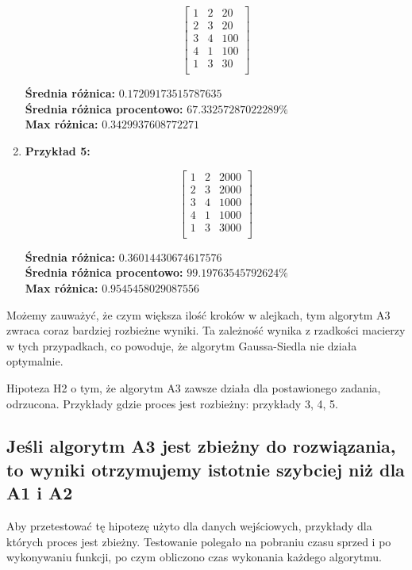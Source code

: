 \documentclass[12pt,a4paper]{article}
\begin{document}
\begin{enumerate}
\[
\begin{bmatrix}
1 & 2 & 20 \\
2 & 3 & 20 \\
3 & 4 & 100 \\
4 & 1 & 100 \\
1 & 3 & 30 \\
\end{bmatrix}
\]

\textbf{Średnia różnica:} $0.17209173515787635$ \\
\textbf{Średnia różnica procentowo:} $67.33257287022289 \%$ \\
\textbf{Max różnica:} $0.3429937608772271$

\item \textbf{Przykład 5:}

\[
\begin{bmatrix}
1 & 2 & 2000 \\
2 & 3 & 2000 \\
3 & 4 & 1000 \\
4 & 1 & 1000 \\
1 & 3 & 3000 \\
\end{bmatrix}
\]

\textbf{Średnia różnica:} $0.36014430674617576$ \\
\textbf{Średnia różnica procentowo:} $99.19763545792624 \%$ \\
\textbf{Max różnica:} $0.9545458029087556$
\end{enumerate}

Możemy zauważyć, że czym większa ilość kroków w alejkach, tym algorytm A3 zwraca coraz bardziej rozbieżne wyniki. Ta zależność wynika z rzadkości macierzy w tych przypadkach, co powoduje, że algorytm Gaussa-Siedla nie działa optymalnie.

Hipoteza H2 o tym, że algorytm A3 zawsze działa dla postawionego zadania, odrzucona. Przykłady gdzie proces jest rozbieżny: przykłady 3, 4, 5.

\newpage

\subsection{Jeśli algorytm A3 jest zbieżny do rozwiązania, to wyniki otrzymujemy istotnie szybciej niż dla A1 i A2}

Aby przetestować tę hipotezę użyto dla danych wejściowych, przykłady dla których proces jest zbieżny. Testowanie polegało na pobraniu czasu sprzed i po wykonywaniu funkcji, po czym obliczono czas wykonania każdego algorytmu.
\end{document}
